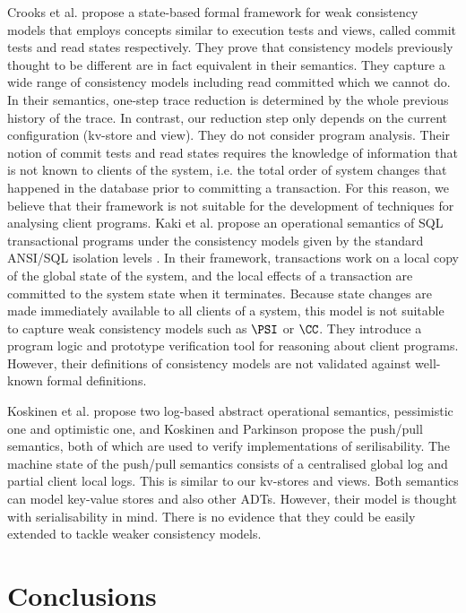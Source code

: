 Crooks et al. \citet{seebelieve} propose a state-based formal framework for weak consistency models 
that employs concepts  similar to execution tests and views, called commit tests and read states respectively.
They prove that consistency models previously thought to be different are in fact equivalent in their semantics. 
They capture a wide range of consistency models including read committed which we cannot do. 
In their semantics, one-step trace reduction is determined by the whole previous history of the trace. 
In contrast, our reduction step only depends on the current configuration (kv-store and view).
They do not consider program analysis. Their notion of commit tests and read states requires 
the knowledge of information that is not known to clients of the system, i.e. the total order of system changes that happened in the database 
prior to committing a transaction. For this reason, we believe that
their framework is not suitable for the development of techniques for analysing client programs. 
Kaki et al. \citet{alonetogether} propose an operational semantics of SQL transactional programs 
under the consistency models given by the standard ANSI/SQL isolation levels \cite{si}.
In their  framework, transactions work on a local copy of the global state 
of the system, and the local effects of a transaction are committed to the  
system state when it terminates. Because state changes 
are made immediately available to all clients of a system, this model 
is not suitable to capture weak consistency models such as \(\PSI\) or \(\CC\). 
They introduce a program logic and prototype verification tool for reasoning 
about client programs. However, their definitions of consistency models 
are not validated against well-known formal definitions.

Koskinen et al. \citet{log-based-op} propose two log-based abstract operational semantics,
pessimistic one and optimistic one,
and Koskinen and Parkinson \citet{push-pull} propose the push/pull semantics,
both of which are used to verify implementations of serilisability.
The machine state of the push/pull semantics consists of a centralised global log 
and partial client local logs.
This is similar to our kv-stores and views.
Both semantics can model key-value stores and also other ADTs.
However, their model is thought with serialisability in mind.
There is no evidence that they could be easily extended to tackle weaker consistency models.



\section{Conclusions}
\label{sec:conclusions}

